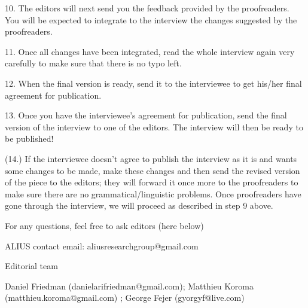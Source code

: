 \documentclass[11pt]{article}
\begin{document}
10. The editors will next send you the feedback provided by the proofreaders. You will be expected to integrate to the interview the changes suggested by the proofreaders.\par

11. Once all changes have been integrated, read the whole interview again very carefully to make sure that there is no typo left.\par

12. When the final version is ready, send it to the interviewee to get his/her final agreement for publication.\par

13. Once you have the interviewee’s agreement for publication, send the final version of the interview to one of the editors. The interview will then be ready to be published!\par

(14.) If the interviewee doesn’t agree to publish the interview as it is and wants some changes to be made, make these changes and then send the revised version of the piece to the editors; they will forward it once more to the proofreaders to make sure there are no grammatical/linguistic problems. Once proofreaders have gone through the interview, we will proceed as described in step 9 above.\par

For any questions, feel free to ask editors (here below)\par

ALIUS contact email: aliusresearchgroup@gmail.com\par

Editorial team\par

Daniel Friedman (danielarifriedman@gmail.com); Matthieu Koroma (matthieu.koroma@gmail.com) ; George Fejer (gyorgyf@live.com)\par
\end{document}
